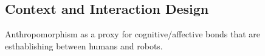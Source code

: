 \documentclass[lettersize, noapacite, twoside, HRI]{apa_HRI}
\begin{document}
\subsection{Context and Interaction Design}



Anthropomorphism as a proxy for cognitive/affective bonds that are esthablishing
between humans and robots.





%
%
\end{document}
